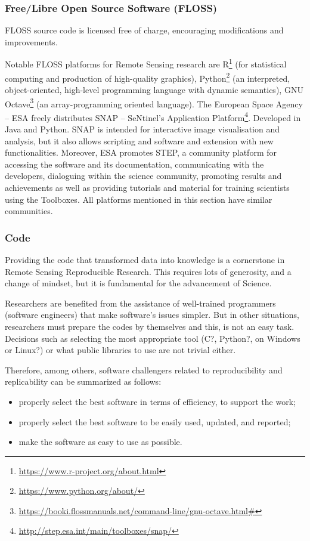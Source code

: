 \documentclass[journal,twoside]{IEEEtran}
\begin{document}
\subsubsection{Free/Libre Open Source Software (FLOSS)}

FLOSS source code is licensed free of charge, encouraging modifications and improvements.

Notable FLOSS platforms for Remote Sensing research are 
R\footnote{\url{https://www.r-project.org/about.html}} (for statistical computing and production of high-quality graphics),
Python\footnote{\url{https://www.python.org/about/}} (an interpreted, object-oriented, high-level programming language with dynamic semantics),
GNU Octave\footnote{\url{https://booki.flossmanuals.net/command-line/gnu-octave.html#}} (an array-programming oriented language).
The European Space Agency -- ESA freely distributes SNAP -- SeNtinel’s Application Platform\footnote{\url{http://step.esa.int/main/toolboxes/snap/}}.
Developed in Java and Python.
SNAP is intended for interactive image visualisation and analysis, but it also allows scripting and software and extension with new functionalities.
Moreover, ESA promotes STEP, a community platform for accessing the software and its documentation, communicating with the developers, dialoguing within the science community, promoting results and achievements as well as providing tutorials and material for training scientists using the Toolboxes.
All platforms mentioned in this section have similar communities.

\subsubsection{Code}

Providing the code that transformed data into knowledge is a cornerstone in Remote Sensing Reproducible Research.
This requires lots of generosity, and a change of mindset, but it is fundamental for the advancement of Science.

Researchers are benefited from the assistance of well-trained programmers (software engineers) that make software's issues simpler. 
But in other situations, researchers must prepare the codes by themselves and this, is not an easy task. 
Decisions such as selecting the most appropriate tool (C?, Python?, on Windows or Linux?) or what public libraries to use are not trivial either.

Therefore, among others, software challengers related to reproducibility and replicability can be summarized as follows:
\begin{itemize}
	\item properly select the best software in terms of efficiency, to support the work;
	\item properly select the best software to be easily used, updated, and reported;
	\item make the software as easy to use as possible.
\end{itemize}
\end{document}

